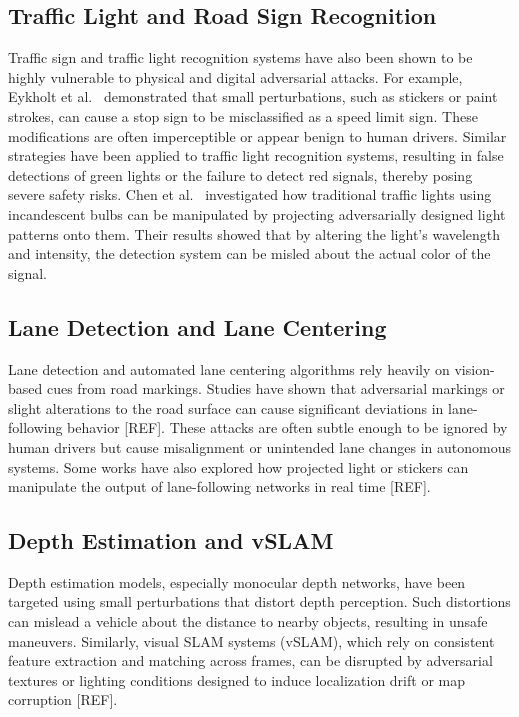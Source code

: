 \subsection{Traffic Light and Road Sign Recognition}
Traffic sign and traffic light recognition systems have also been shown to be highly vulnerable to physical and digital adversarial attacks. 
For example, Eykholt et al.\ \cite{10.11453319535.3354259} demonstrated that small perturbations, such as stickers or paint strokes, can cause a stop sign to be misclassified as a speed limit sign. 
These modifications are often imperceptible or appear benign to human drivers. Similar strategies have been applied to traffic light recognition systems, resulting in false detections of green lights or the failure to detect red signals, thereby posing severe safety risks. 
Chen et al.\ \cite{277268} investigated how traditional traffic lights using incandescent bulbs can be manipulated by projecting adversarially designed light patterns onto them. Their results showed that by altering the light’s wavelength and intensity, the detection system can be misled about the actual color of the signal.

\subsection{Lane Detection and Lane Centering}
Lane detection and automated lane centering algorithms rely heavily on vision-based cues from road markings. Studies have shown that adversarial markings or slight alterations to the road surface can cause significant deviations in lane-following behavior [REF]. 
These attacks are often subtle enough to be ignored by human drivers but cause misalignment or unintended lane changes in autonomous systems. Some works have also explored how projected light or stickers can manipulate the output of lane-following networks in real time [REF].

\subsection{Depth Estimation and vSLAM}
Depth estimation models, especially monocular depth networks, have been targeted using small perturbations that distort depth perception. 
Such distortions can mislead a vehicle about the distance to nearby objects, resulting in unsafe maneuvers. 
Similarly, visual SLAM systems (vSLAM), which rely on consistent feature extraction and matching across frames, can be disrupted by adversarial textures or lighting conditions designed to induce localization drift or map corruption [REF].

